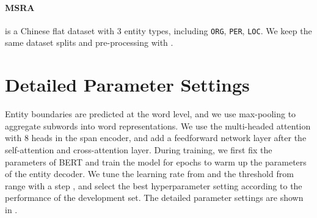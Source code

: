 \documentclass[11pt]{article}
\begin{document}
\paragraph{MSRA} \citep{levow-2006-third} is a Chinese flat dataset with 3 entity types, including \texttt{ORG}, \texttt{PER}, \texttt{LOC}. We keep the same dataset splits and pre-processing with \citet{li2022unified, shen-etal-2021-locate}.




\section{Detailed Parameter Settings}
\label{app:settings}

Entity boundaries are predicted at the word level, and we use max-pooling to aggregate subwords into word representations. We use the multi-headed attention with 8 heads in the span encoder, and add a feedforward network layer after the self-attention and cross-attention layer. During training, we first fix the parameters of BERT and train the model for  epochs to warm up the parameters of the entity decoder. We tune the learning rate from  and the threshold  from range  with a step , and select the best hyperparameter setting according to the performance of the development set. The detailed parameter settings are shown in .
\end{document}
